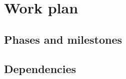 
\section{Work plan}
\label{sec:workplan}


\subsection{Phases and milestones}
\label{sec:milestones}


\subsection{Dependencies}
\label{sec:dependencies}

